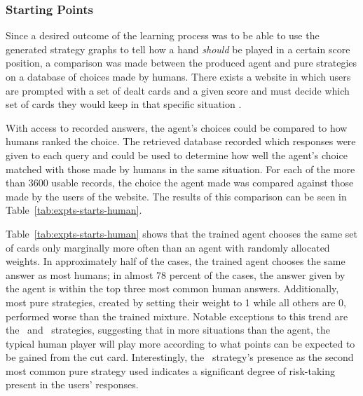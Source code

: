 

\subsubsection*{Starting Points}
\label{sec:findings-expts-starts}


Since a desired outcome of the learning process was to be able to use the
generated strategy graphs to tell how a hand \textit{should} be played in a
certain score position,
a comparison was made between the produced agent and pure strategies
on a database of choices made by humans.
%
There exists a website in which users are prompted with a set of dealt cards and
a given score and must decide which set of cards they would keep in that
specific situation
\cite{dailycribbagehand}.

With access to recorded answers,
the agent's choices could be compared to how humans ranked the choice.
%
The retrieved database recorded which responses were given to each query
and could be used to determine how well the agent's choice matched with those
made by humans in the same situation.
%
For each of the more than 3600 usable records,
the choice the agent made was compared against those made by the users of the
website.
%
The results of this comparison can be seen in
Table~\ref{tab:expts-starts-human}. %

Table~\ref{tab:expts-starts-human} shows that the trained agent chooses the same
set of cards only marginally more often than an agent with randomly allocated
weights.
%
In approximately half of the cases,
the trained agent chooses the same answer as most humans;
in almost 78 percent of the cases,
the answer given by the agent is within the top three most common human answers.
%
Additionally,
most pure strategies,
created by setting their weight to 1 while all others are 0,
performed worse than the trained mixture.
%
Notable exceptions to this trend are the \handmaxposs\ and \handmaxavg\ 
strategies,
suggesting that in more situations than the agent,
the typical human player will play more according to what points can be expected
to be gained from the cut card.
%
Interestingly,
the \handmaxposs\ strategy's presence as the second most common pure strategy
used indicates a significant degree of risk-taking present in the users'
responses.

